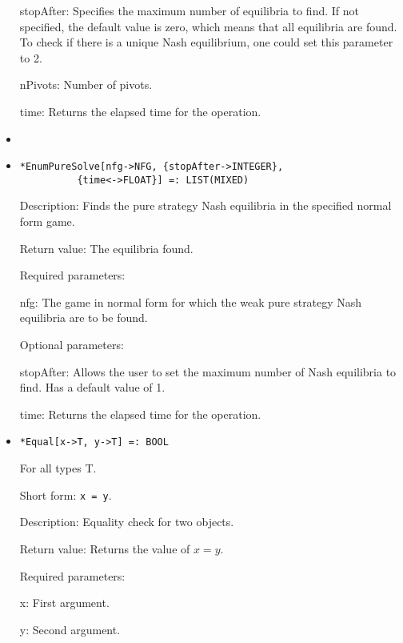 \begin{itemize}
\bd
\item
[stopAfter:] Specifies the maximum number of equilibria to find.  If
not specified, the default value is zero, which means that all
equilibria are found.  To check if there is a unique Nash equilibrium,
one could set this parameter to 2.
\item
[nPivots:] Number of pivots. 
\item
[time:] Returns the elapsed time for the operation.
\item
\ed
\ed

\item
\protect \large \begin{verbatim}
*EnumPureSolve[nfg->NFG, {stopAfter->INTEGER}, 
          {time<->FLOAT}] =: LIST(MIXED) 
\end{verbatim}\normalsize

\bd
\item
[Description:] Finds the pure strategy Nash equilibria in the
specified normal form game.  
\item
[Return value:] The equilibria
found.  
\item
[Required parameters:]\hfil\null
	
\bd
\item
[nfg:] The game in normal form for which the weak pure strategy Nash
equilibria are to be found.
\ed

\item
[Optional parameters:]\hfil\null
	
\bd
\item
[stopAfter:] Allows the user to set the maximum number of Nash equilibria to
find.  Has a default value of 1.
\item
[time:] Returns the elapsed time for the operation.
\ed
\ed

\item
\protect \large \begin{verbatim}
*Equal[x->T, y->T] =: BOOL
\end{verbatim}\normalsize

For all types T.

\bd
\item
[Short form:] \verb+x = y+.
\item
[Description:] Equality check for two objects.
\item
[Return value:] Returns the value of $x = y$.
\item
[Required parameters:]\hfil\null
	
\bd
\item
[x:] First argument.
\item
[y:] Second argument.
\ed


\end{itemize}
